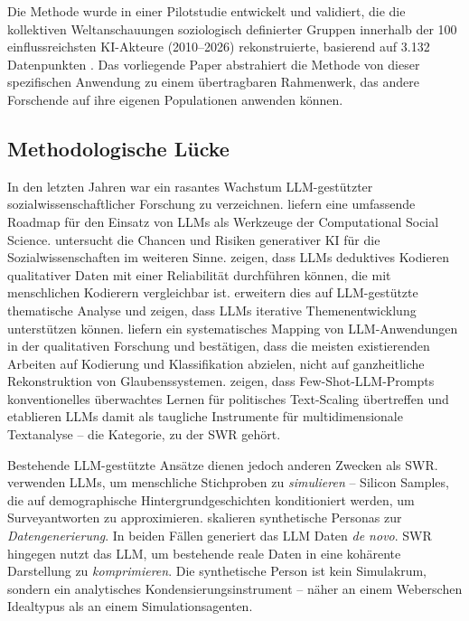 \documentclass[11pt,a4paper]{article}
\begin{document}
Die Methode wurde in einer Pilotstudie entwickelt und validiert, die die kollektiven Weltanschauungen soziologisch definierter Gruppen innerhalb der 100 einflussreichsten KI-Akteure (2010--2026) rekonstruierte, basierend auf 3.132 Datenpunkten \citep{Geiger2026PaperA}. Das vorliegende Paper abstrahiert die Methode von dieser spezifischen Anwendung zu einem \"ubertragbaren Rahmenwerk, das andere Forschende auf ihre eigenen Populationen anwenden k\"onnen.


\subsection{Methodologische L\"ucke}
\label{sec:intro:gap}

In den letzten Jahren war ein rasantes Wachstum LLM-gest\"utzter sozialwissenschaftlicher Forschung zu verzeichnen. \citet{Ziems2024} liefern eine umfassende Roadmap f\"ur den Einsatz von LLMs als Werkzeuge der Computational Social Science. \citet{Bail2024} untersucht die Chancen und Risiken generativer KI f\"ur die Sozialwissenschaften im weiteren Sinne. \citet{Tai2024} zeigen, dass LLMs deduktives Kodieren qualitativer Daten mit einer Reliabilit\"at durchf\"uhren k\"onnen, die mit menschlichen Kodierern vergleichbar ist. \citet{Wang2025} erweitern dies auf LLM-gest\"utzte thematische Analyse und zeigen, dass LLMs iterative Themenentwicklung unterst\"utzen k\"onnen. \citet{Barros2024} liefern ein systematisches Mapping von LLM-Anwendungen in der qualitativen Forschung und best\"atigen, dass die meisten existierenden Arbeiten auf Kodierung und Klassifikation abzielen, nicht auf ganzheitliche Rekonstruktion von Glaubenssystemen. \citet{Ornstein2025} zeigen, dass Few-Shot-LLM-Prompts konventionelles \"uberwachtes Lernen f\"ur politisches Text-Scaling \"ubertreffen und etablieren LLMs damit als taugliche Instrumente f\"ur multidimensionale Textanalyse -- die Kategorie, zu der SWR geh\"ort.

Bestehende LLM-gest\"utzte Ans\"atze dienen jedoch anderen Zwecken als SWR. \citet{Argyle2023} verwenden LLMs, um menschliche Stichproben zu \emph{simulieren} -- \glqq{}Silicon Samples\grqq{}, die auf demographische Hintergrundgeschichten konditioniert werden, um Surveyantworten zu approximieren. \citet{Ge2024} skalieren synthetische Personas zur \emph{Datengenerierung}. In beiden F\"allen generiert das LLM Daten \emph{de novo}. SWR hingegen nutzt das LLM, um bestehende reale Daten in eine koh\"arente Darstellung zu \emph{komprimieren}. Die synthetische Person ist kein Simulakrum, sondern ein analytisches Kondensierungsinstrument -- n\"aher an einem Weberschen Idealtypus als an einem Simulationsagenten.
\end{document}
